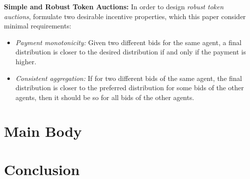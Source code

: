 \documentclass{article}
\begin{document}
\textbf{Simple and Robust Token Auctions:} In order to design \textit{robust token auctions}, formulate two desirable 
incentive properties, which this paper consider minimal requirements:

\begin{itemize}
    \item \textit{Payment monotonicity:} Given two different bids for the same agent, a final distribution is closer to the desired distribution if and only if the payment is higher.
    \item \textit{Consistent aggregation:} If for two different bids of the same agent, the final distribution is closer to the preferred distribution for some bids of the other agents, then it should be so for all bids of the other agents.
\end{itemize}

\section{Main Body}


\section{Conclusion}

\end{document}
